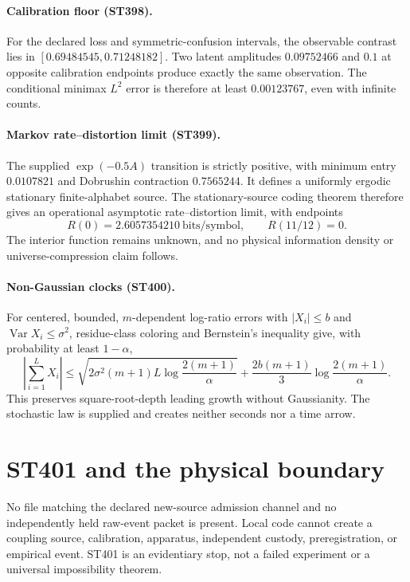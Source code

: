 \documentclass[11pt,a4paper]{article}
\begin{document}
\paragraph{Calibration floor (ST398).}
For the declared loss and symmetric-confusion intervals, the observable contrast lies
in $[0.69484545,0.71248182]$.  Two latent amplitudes $0.09752466$ and $0.1$ at opposite
calibration endpoints produce exactly the same observation.  The conditional minimax
$L^2$ error is therefore at least $0.00123767$, even with infinite counts.

\paragraph{Markov rate--distortion limit (ST399).}
The supplied $\exp(-0.5A)$ transition is strictly positive, with minimum entry
$0.0107821$ and Dobrushin contraction $0.7565244$.  It defines a uniformly ergodic
stationary finite-alphabet source.  The stationary-source coding theorem therefore
gives an operational asymptotic rate--distortion limit, with endpoints
\[
 R(0)=2.6057354210\ \text{bits/symbol},\qquad R(11/12)=0.
\]
The interior function remains unknown, and no physical information density or
universe-compression claim follows.

\paragraph{Non-Gaussian clocks (ST400).}
For centered, bounded, $m$-dependent log-ratio errors with
$|X_i|\le b$ and $\operatorname{Var}X_i\le\sigma^2$, residue-class coloring and
Bernstein's inequality give, with probability at least $1-\alpha$,
\[
 \left|\sum_{i=1}^{L}X_i\right|
 \le\sqrt{2\sigma^2(m+1)L\log\frac{2(m+1)}\alpha}
 +\frac{2b(m+1)}3\log\frac{2(m+1)}\alpha.
\]
This preserves square-root-depth leading growth without Gaussianity.  The stochastic
law is supplied and creates neither seconds nor a time arrow.

\section{ST401 and the physical boundary}

No file matching the declared new-source admission channel and no independently held
raw-event packet is present.  Local code cannot create a coupling source, calibration,
apparatus, independent custody, preregistration, or empirical event.  ST401 is an
evidentiary stop, not a failed experiment or a universal impossibility theorem.
\end{document}
